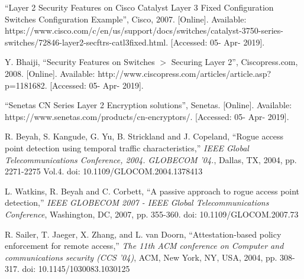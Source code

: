 \documentclass[journal]{IEEEtran}
\begin{document}
\begin{thebibliography}{00}

 ``Layer 2 Security Features on Cisco Catalyst Layer 3 Fixed Configuration Switches
Configuration Example'', Cisco, 2007. [Online]. Available:
https://www.cisco.com/c/en/us/support/docs/switches/catalyst-3750-series-switches/72846-layer2-secftrs-catl3fixed.html.
 [Accessed: 05- Apr- 2019].

 Y. Bhaiji, ``Security Features on Switches $>$ Securing Layer 2'', Ciscopress.com,
2008. [Online]. Available: http://www.ciscopress.com/articles/article.asp?p=1181682. [Accessed: 05-
Apr- 2019].

 ``Senetas CN Series Layer 2 Encryption solutions'', Senetas. [Online]. Available:
https://www.senetas.com/products/cn-encryptors/. [Accessed: 05- Apr- 2019].

 R. Beyah, S. Kangude, G. Yu, B. Strickland and J. Copeland, ``Rogue access point
detection using temporal traffic characteristics,'' \textit{IEEE Global Telecommunications
Conference, 2004. GLOBECOM '04.}, Dallas, TX, 2004, pp. 2271-2275 Vol.4. doi:
10.1109/GLOCOM.2004.1378413

 L. Watkins, R. Beyah and C. Corbett, ``A passive approach to rogue access point
detection,''  \textit{IEEE GLOBECOM 2007 - IEEE Global Telecommunications Conference}, Washington,
DC, 2007, pp. 355-360. doi: 10.1109/GLOCOM.2007.73

 R. Sailer, T. Jaeger, X. Zhang, and L. van Doorn, ``Attestation-based policy
enforcement for remote access,'' \textit{The 11th ACM conference on Computer and communications
security (CCS '04)}, ACM, New York, NY, USA, 2004, pp. 308-317. doi: 10.1145/1030083.1030125

\end{thebibliography}
\end{document}
